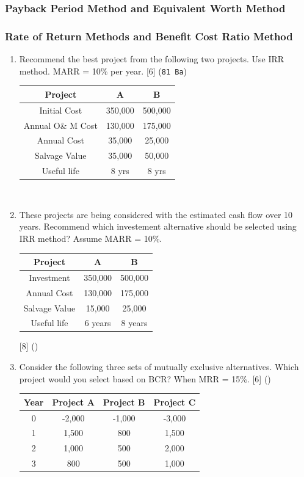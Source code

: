 \documentclass[12pt]{article}
\begin{document}
	\subsubsection{Payback Period Method and Equivalent Worth Method}
	\subsubsection{Rate of Return Methods and Benefit Cost Ratio Method}
	\begin{enumerate}[noitemsep, topsep=0pt]
		\item Recommend the best project from the following two projects. Use IRR method. MARR = 10\% per year. \hfill [6] (\texttt{81 Ba})\\
		\begin{tabular}{|c|c|c|}
			\hline
			Project & A & B \\ \hline
			Initial Cost & 350,000 & 500,000 \\ \hline
			Annual O\& M Cost & 130,000 & 175,000 \\ \hline
			Annual Cost & 35,000 & 25,000 \\ \hline
			Salvage Value & 35,000 & 50,000 \\ \hline
			Useful life & 8 yrs & 8 yrs \\ \hline
		\end{tabular}\\
		
		\item These projects are being considered with the estimated cash flow over 10 years. Recommend which investement alternative should be selected using IRR method? Assume MARR = 10\%. 
		\begin{tabular}{|c|c|c|}
			\hline
			Project & A & B \\ \hline
			Investment & 350,000 & 500,000 \\ \hline
			Annual Cost & 130,000 & 175,000 \\ \hline
			Salvage Value & 15,000 & 25,000 \\ \hline
			Useful life & 6 years & 8 years \\ \hline			
		\end{tabular}		
		\hfill [8] ()
		
		\item Consider the following three sets of mutually exclusive alternatives. Which project would you select based on BCR? When MRR = 15\%. \hfill [6] ()\\
		\begin{tabular}{|c|c|c|c|}
			\hline
			Year & Project A & Project B & Project C \\ \hline
			0 & -2,000 & -1,000 & -3,000 \\ \hline
			1 & 1,500 & 800 & 1,500 \\ \hline
			2 & 1,000 & 500 & 2,000 \\ \hline
			3 & 800 & 500 & 1,000 \\ \hline
		\end{tabular}
		

\end{enumerate}
\end{document}
